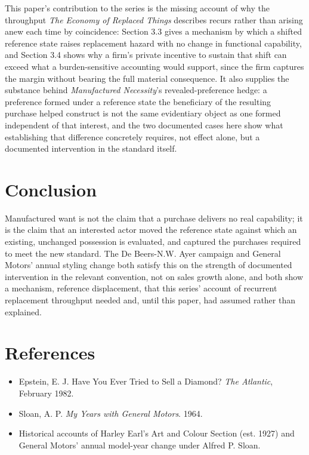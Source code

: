 \documentclass[11pt]{article}
\begin{document}
This paper's contribution to the series is the missing account of why the throughput \emph{The Economy of Replaced Things} describes recurs rather than arising anew each time by coincidence: Section 3.3 gives a mechanism by which a shifted reference state raises replacement hazard with no change in functional capability, and Section 3.4 shows why a firm's private incentive to sustain that shift can exceed what a burden-sensitive accounting would support, since the firm captures the margin without bearing the full material consequence. It also supplies the substance behind \emph{Manufactured Necessity}'s revealed-preference hedge: a preference formed under a reference state the beneficiary of the resulting purchase helped construct is not the same evidentiary object as one formed independent of that interest, and the two documented cases here show what establishing that difference concretely requires, not effect alone, but a documented intervention in the standard itself.

\section{Conclusion}

Manufactured want is not the claim that a purchase delivers no real capability; it is the claim that an interested actor moved the reference state against which an existing, unchanged possession is evaluated, and captured the purchases required to meet the new standard. The De Beers-N.W. Ayer campaign and General Motors' annual styling change both satisfy this on the strength of documented intervention in the relevant convention, not on sales growth alone, and both show a mechanism, reference displacement, that this series' account of recurrent replacement throughput needed and, until this paper, had assumed rather than explained.

\section*{References}
\begin{itemize}[nosep]
\item Epstein, E. J. Have You Ever Tried to Sell a Diamond? \emph{The Atlantic}, February 1982.
\item Sloan, A. P. \emph{My Years with General Motors}. 1964.
\item Historical accounts of Harley Earl's Art and Colour Section (est. 1927) and General Motors' annual model-year change under Alfred P. Sloan.
\end{itemize}
\end{document}
